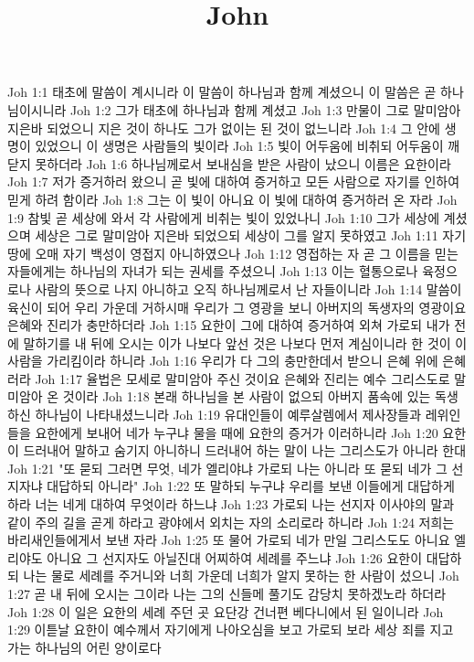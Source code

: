 

\title{John}

Joh 1:1  태초에 말씀이 계시니라 이 말씀이 하나님과 함께 계셨으니 이 말씀은 곧 하나님이시니라
Joh 1:2  그가 태초에 하나님과 함께 계셨고
Joh 1:3  만물이 그로 말미암아 지은바 되었으니 지은 것이 하나도 그가 없이는 된 것이 없느니라
Joh 1:4  그 안에 생명이 있었으니 이 생명은 사람들의 빛이라
Joh 1:5  빛이 어두움에 비취되 어두움이 깨닫지 못하더라
Joh 1:6  하나님께로서 보내심을 받은 사람이 났으니 이름은 요한이라
Joh 1:7  저가 증거하러 왔으니 곧 빛에 대하여 증거하고 모든 사람으로 자기를 인하여 믿게 하려 함이라
Joh 1:8  그는 이 빛이 아니요 이 빛에 대하여 증거하러 온 자라
Joh 1:9  참빛 곧 세상에 와서 각 사람에게 비취는 빛이 있었나니
Joh 1:10  그가 세상에 계셨으며 세상은 그로 말미암아 지은바 되었으되 세상이 그를 알지 못하였고
Joh 1:11  자기 땅에 오매 자기 백성이 영접지 아니하였으나
Joh 1:12  영접하는 자 곧 그 이름을 믿는 자들에게는 하나님의 자녀가 되는 권세를 주셨으니
Joh 1:13  이는 혈통으로나 육정으로나 사람의 뜻으로 나지 아니하고 오직 하나님께로서 난 자들이니라
Joh 1:14  말씀이 육신이 되어 우리 가운데 거하시매 우리가 그 영광을 보니 아버지의 독생자의 영광이요 은혜와 진리가 충만하더라
Joh 1:15  요한이 그에 대하여 증거하여 외쳐 가로되 내가 전에 말하기를 내 뒤에 오시는 이가 나보다 앞선 것은 나보다 먼저 계심이니라 한 것이 이 사람을 가리킴이라 하니라
Joh 1:16  우리가 다 그의 충만한데서 받으니 은혜 위에 은혜러라
Joh 1:17  율법은 모세로 말미암아 주신 것이요 은혜와 진리는 예수 그리스도로 말미암아 온 것이라
Joh 1:18  본래 하나님을 본 사람이 없으되 아버지 품속에 있는 독생하신 하나님이 나타내셨느니라
Joh 1:19  유대인들이 예루살렘에서 제사장들과 레위인들을 요한에게 보내어 네가 누구냐 물을 때에 요한의 증거가 이러하니라
Joh 1:20  요한이 드러내어 말하고 숨기지 아니하니 드러내어 하는 말이 나는 그리스도가 아니라 한대
Joh 1:21  "또 묻되 그러면 무엇, 네가 엘리야냐 가로되 나는 아니라 또 묻되 네가 그 선지자냐 대답하되 아니라"
Joh 1:22  또 말하되 누구냐 우리를 보낸 이들에게 대답하게 하라 너는 네게 대하여 무엇이라 하느냐
Joh 1:23  가로되 나는 선지자 이사야의 말과 같이 주의 길을 곧게 하라고 광야에서 외치는 자의 소리로라 하니라
Joh 1:24  저희는 바리새인들에게서 보낸 자라
Joh 1:25  또 물어 가로되 네가 만일 그리스도도 아니요 엘리야도 아니요 그 선지자도 아닐진대 어찌하여 세례를 주느냐
Joh 1:26  요한이 대답하되 나는 물로 세례를 주거니와 너희 가운데 너희가 알지 못하는 한 사람이 섰으니
Joh 1:27  곧 내 뒤에 오시는 그이라 나는 그의 신들메 풀기도 감당치 못하겠노라 하더라
Joh 1:28  이 일은 요한의 세례 주던 곳 요단강 건너편 베다니에서 된 일이니라
Joh 1:29  이튿날 요한이 예수께서 자기에게 나아오심을 보고 가로되 보라 세상 죄를 지고 가는 하나님의 어린 양이로다

